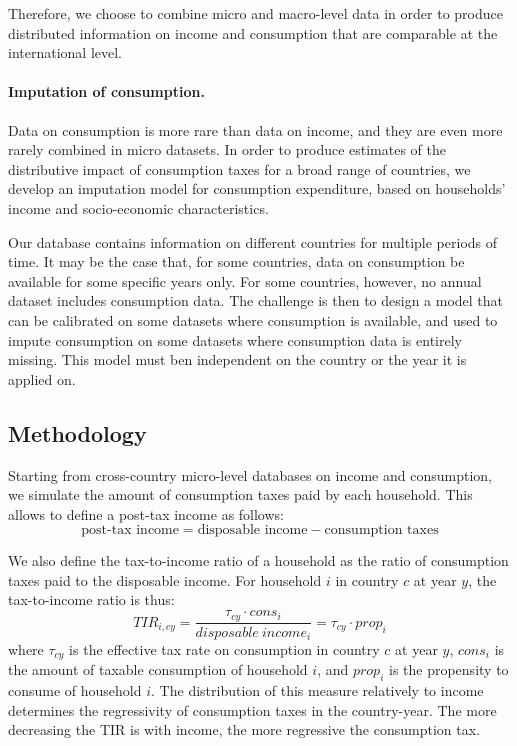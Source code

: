 \documentclass[12pt]{article}
\begin{document}
Therefore, we choose to combine micro and macro-level data in order to produce distributed information on income and consumption that are comparable at the international level.

\paragraph{Imputation of consumption.} Data on consumption is more rare than data on income, and they are even more rarely combined in micro datasets. In order to produce estimates of the distributive impact of consumption taxes for a broad range of countries, we develop an imputation model for consumption expenditure, based on households' income and socio-economic characteristics.

Our database contains information on different countries for multiple periods of time. It may be the case that, for some countries, data on consumption be available for some specific years only. For some countries, however, no annual dataset includes consumption data. The challenge is then to design a model that can be calibrated on some datasets where consumption is available, and used to impute consumption on some datasets where consumption data is entirely missing. This model must ben independent on the country or the year it is applied on.


\subsection{Methodology}
Starting from cross-country micro-level databases on income and consumption, we simulate the amount of consumption taxes paid by each household. This allows to define a post-tax income as follows:
\begin{equation}  \text{post-tax income} = \text{disposable income} - \text{consumption taxes} \end{equation}

We also define the tax-to-income ratio of a household as the ratio of consumption taxes paid to the disposable income. For household $i$ in country $c$ at year $y$, the tax-to-income ratio is thus:
\begin{equation}
\label{eq:TIR}
TIR_{i,cy} = \frac{\tau_{cy} \cdot cons_i}{disposable\ income_i} = \tau_{cy} \cdot prop_i \end{equation}
where $\tau_{cy}$ is the effective tax rate on consumption in country $c$ at year $y$, $cons_i$ is the amount of taxable consumption of household $i$, and $prop_i$ is the propensity to consume of household $i$. The distribution of this measure relatively to income determines the regressivity of consumption taxes in the country-year. The more decreasing the TIR is with income, the more regressive the consumption tax.
\end{document}
